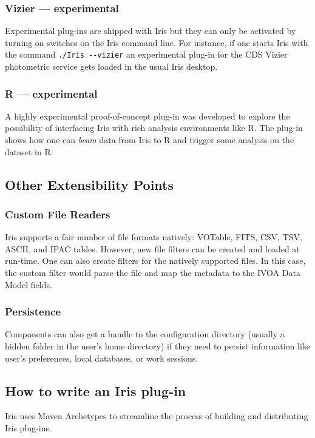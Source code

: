 \documentclass[preprint,authoryear,5p]{elsarticle}
\begin{document}
\subsubsection{Vizier --- experimental} \label{sec:asdc} Experimental plug-ins
are shipped with Iris but they can only be activated by turning on switches on
the Iris command line. For instance, if one starts Iris with the command
\verb|./Iris --vizier| an experimental plug-in for the CDS Vizier photometric
service gets loaded in the usual Iris desktop.

\subsubsection{R --- experimental} A highly experimental proof-of-concept
plug-in was developed to explore the possibility of interfacing Iris with rich
analysis environments like R. The plug-in shows how one can \emph{beam} data
from Iris to R and trigger some analysis on the dataset in R.


\subsection{Other Extensibility Points}

\subsubsection{Custom File Readers} Iris supports a fair number of file formats
natively: VOTable, FITS, CSV, TSV, ASCII, and IPAC tables. However, new file
filters can be created and loaded at run-time. One can also create filters for
the natively supported files. In this case, the custom filter would parse the
file and map the metadata to the IVOA Data Model fields.

\subsubsection{Persistence} Components can also get a handle to the
configuration directory (usually a hidden folder in the user's home directory)
if they need to persist information like user's preferences, local databases, or
work sessions.



\subsection{How to write an Iris plug-in} \label{sec:writeplugin} Iris uses Maven
Archetypes to streamline the process of building and distributing Iris plug-ins.
\end{document}
